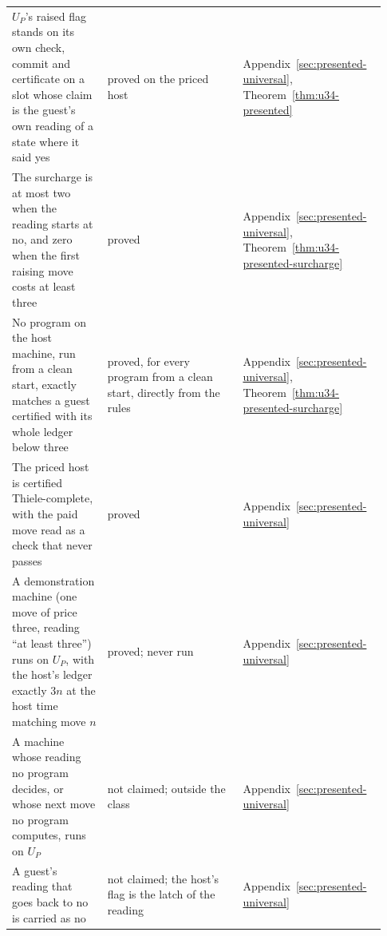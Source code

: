 \documentclass[11pt,twoside]{article}
\theoremstyle{thielethm}
\theoremstyle{thieledef}
\theoremstyle{thieledef}
\theoremstyle{thieledef}
\theoremstyle{thielethm}
\theoremstyle{thieleobs}
\theoremstyle{thielethm}
\begin{document}
\begin{longtable}{@{}>{\raggedright\arraybackslash}p{0.242\linewidth}>{\raggedright\arraybackslash}p{0.344\linewidth}>{\raggedright\arraybackslash}p{0.344\linewidth}@{}}
$U_P$'s raised flag stands on its own check, commit and certificate on a slot whose claim is the guest's own reading of a state where it said yes & proved on the priced host & Appendix~\ref{sec:presented-universal}, Theorem~\ref{thm:u34-presented} \\
The surcharge is at most two when the reading starts at no, and zero when the first raising move costs at least three & proved & Appendix~\ref{sec:presented-universal}, Theorem~\ref{thm:u34-presented-surcharge} \\
No program on the host machine, run from a clean start, exactly matches a guest certified with its whole ledger below three & proved, for every program from a clean start, directly from the rules & Appendix~\ref{sec:presented-universal}, Theorem~\ref{thm:u34-presented-surcharge} \\
The priced host is certified Thiele-complete, with the paid move read as a check that never passes & proved & Appendix~\ref{sec:presented-universal} \\
A demonstration machine (one move of price three, reading ``at least three'') runs on $U_P$, with the host's ledger exactly $3n$ at the host time matching move $n$ & proved; never run & Appendix~\ref{sec:presented-universal} \\
A machine whose reading no program decides, or whose next move no program computes, runs on $U_P$ & not claimed; outside the class & Appendix~\ref{sec:presented-universal} \\
A guest's reading that goes back to no is carried as no & not claimed; the host's flag is the latch of the reading & Appendix~\ref{sec:presented-universal} \\
\end{longtable}
\endgroup
\end{document}
